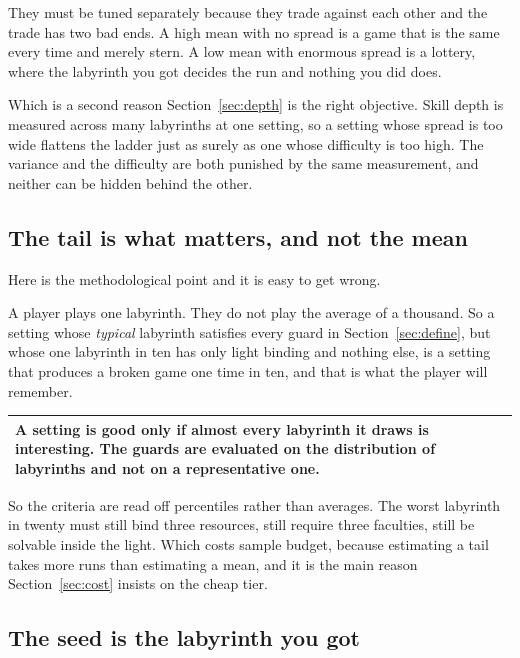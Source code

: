 \documentclass[11pt,a4paper]{article}
\begin{document}
They must be tuned separately because they trade against each other and the trade has two bad ends.
A high mean with no spread is a game that is the same every time and merely stern. A low mean with
enormous spread is a lottery, where the labyrinth you got decides the run and nothing you did
does.

\begin{sectionbox}
Which is a second reason Section~\ref{sec:depth} is the right objective. Skill depth is measured
across many labyrinths at one setting, so a setting whose spread is too wide flattens the ladder
just as surely as one whose difficulty is too high. The variance and the difficulty are both
punished by the same measurement, and neither can be hidden behind the other.
\end{sectionbox}

\subsection{The tail is what matters, and not the mean}

Here is the methodological point and it is easy to get wrong.

A player plays one labyrinth. They do not play the average of a thousand. So a setting whose
\emph{typical} labyrinth satisfies every guard in Section~\ref{sec:define}, but whose one labyrinth
in ten has only light binding and nothing else, is a setting that produces a broken game one time in
ten, and that is what the player will remember.

\begin{center}
\begin{tabular}{@{}>{\raggedright\arraybackslash}p{}@{}}
\toprule
\textbf{A setting is good only if almost every labyrinth it draws is interesting. The guards are
evaluated on the distribution of labyrinths and not on a representative one.} \\
\bottomrule
\end{tabular}
\end{center}

So the criteria are read off percentiles rather than averages. The worst labyrinth in twenty must
still bind three resources, still require three faculties, still be solvable inside the light. Which
costs sample budget, because estimating a tail takes more runs than estimating a mean, and it is the
main reason Section~\ref{sec:cost} insists on the cheap tier.

\subsection{The seed is the labyrinth you got}
\label{sec:seed}
\end{document}
